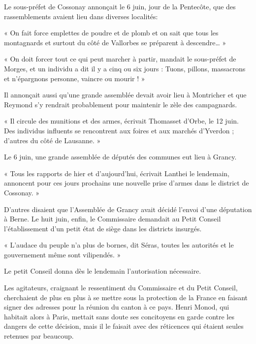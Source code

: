 \documentclass[french,twoside]{book} %
\newenvironment{quoteblock}%
  {\begin{quoting}}
  {\end{quoting}}
\newenvironment{quotebar}{%
    \def\FrameCommand{{\color{rubric!10!}\vrule width 0.5em} \hspace{0.9em}}%
    \def\OuterFrameSep{\itemsep} %
    \MakeFramed {\advance\hsize-\width \FrameRestore}
  }%
  {%
    \endMakeFramed
  }
\renewenvironment{quoteblock}%
  {%
    \savenotes
    \setstretch{0.9}
    \begin{quotebar}
  }
  {%
    \end{quotebar}
    \spewnotes
  }
\begin{document}
\noindent Le sous-préfet de Cossonay annonçait le 6 juin, jour de la Pentecôte, que des rassemblements avaient lieu dans diverses localités:\par

\begin{quoteblock}
 \noindent « On fait force emplettes de poudre et de plomb et on sait que tous les montagnards et surtout du côté de Vallorbes se préparent à descendre… »\par
 « On doit forcer tout ce qui peut marcher à partir, mandait le sous-préfet de Morges, et un individu a dit il y a cinq ou six jours : Tuons, pillons, massacrons et n’épargnons personne, vaincre ou mourir ! »
 \end{quoteblock}

\noindent Il annonçait aussi qu’une grande assemblée devait avoir lieu à Montricher et que Reymond s’y rendrait probablement pour maintenir le zèle des campagnards.\par

\begin{quoteblock}
\noindent « Il circule des munitions et des armes, écrivait Thomasset d’Orbe, le 12 juin. Des individus influents se rencontrent aux foires et aux marchés d’Yverdon ; d’autres du côté de Lausanne. »\end{quoteblock}

\noindent Le 6 juin, une grande assemblée de députés des communes eut lieu à Grancy.\par

\begin{quoteblock}
\noindent « Tous les rapports de hier et d’aujourd’hui, écrivait Lanthei le lendemain, annoncent pour ces jours prochains une nouvelle prise d’armes dans le district de Cossonay. »\end{quoteblock}

\noindent D’autres disaient que l’Assemblée de Grancy avait décidé l’envoi d’une députation à Berne. Le huit juin, enfin, le Commissaire demandait au Petit Conseil l’établissement d’un petit état de siège dans les districts insurgés.\par

\begin{quoteblock}
\noindent « L’audace du peuple n’a plus de bornes, dit Séras, toutes les autorités et le gouvernement même sont vilipendés. »\end{quoteblock}

\noindent Le petit Conseil donna dès le lendemain l’autorisation nécessaire.\par
Les agitateurs, craignant le ressentiment du Commissaire et du Petit Conseil, cherchaient de plus en plus à se mettre sous la protection de la France en faisant signer des adresses pour la réunion du canton à ce pays. Henri Monod, qui habitait alors à Paris, mettait sans doute ses concitoyens en garde contre les dangers de cette décision, mais il le faisait avec des réticences qui étaient seules retenues par beaucoup.\par
\end{document}
